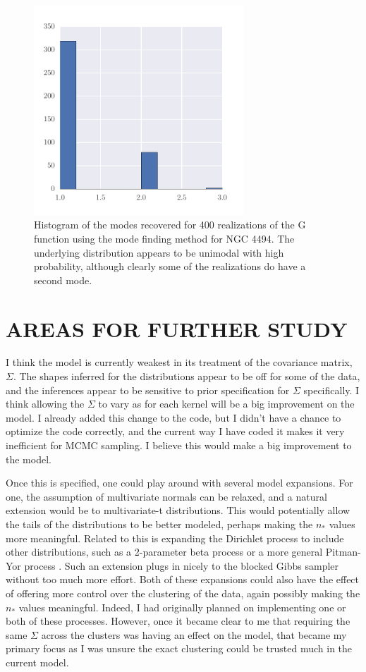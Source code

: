 \documentclass{article}
\begin{document}
\begin{figure}
\centering
\includegraphics[width=0.7\textwidth]{n4494_mode_post.pdf}
\caption{Histogram of the modes recovered for 400 realizations of the G function
using the mode finding method for NGC 4494. The underlying distribution appears to be unimodal with high probability,
although clearly some of the realizations do have a second mode.}
\label{n4494_modes}
\end{figure}

\section{AREAS FOR FURTHER STUDY}
I think the model is currently weakest in its treatment of the covariance matrix, $\Sigma$.
The shapes inferred for the distributions appear to be off for some of the data, and the inferences appear to be
sensitive to prior specification for $\Sigma$ specifically. I think allowing the $\Sigma$ to vary as for each
kernel will be a big improvement on the model. I already added this change to the code, but I didn't have a chance to
optimize the code correctly, and the current way I have coded it makes it very inefficient for MCMC sampling. I believe
this would make a big improvement to the model.

Once this is specified, one could play around with several model expansions. For one, the assumption of multivariate
normals can be relaxed, and a natural extension would be to multivariate-t distributions. This would potentially
allow the tails of the distributions to be better modeled, perhaps making the $n_*$ values more meaningful.
Related to this is expanding the Dirichlet process to include other distributions, such as a 2-parameter beta process
or a more general Pitman-Yor process \citep{ishwaran2001}. Such an extension plugs in nicely to the
blocked Gibbs sampler without too much more effort. Both of these expansions could also
have the effect of offering more control over the clustering of the data, again possibly making the $n_*$ values meaningful.
Indeed, I had originally planned on implementing one or both of these processes. However, once it became clear to me that
requiring the same $\Sigma$ across the clusters was having an effect on the model, that became my primary focus as I was
unsure the exact clustering could be trusted much in the current model. 
\end{document}
